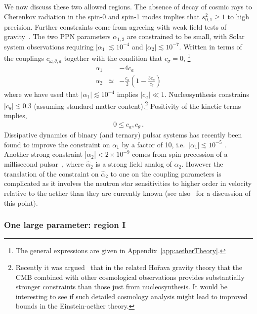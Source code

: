 \documentclass[12pt]{article}
\numberwithin{equation}{section}
\newcommand{\nl}{\nonumber \\}
\begin{document}
We now discuss these two allowed regions. The 
absence of decay of cosmic rays to Cherenkov radiation in the spin-0 and spin-1 modes implies that $s_{0,1}^2 \ge 1$ to high precision.
Further constraints come from agreeing with weak field tests of gravity~\cite{Foster:2005dk}.  The two PPN parameters $\alpha_{1,2}$ are constrained to be  small, with Solar system observations 
requiring $|\alpha_1| \lesssim 10^{-4}$ and $|\alpha_2| \lesssim 10^{-7}$. Written in terms of the couplings $c_{\omega, \theta,a}$ together with the condition that $c_\sigma = 0$, \footnote{The  general expressions are given in Appendix~\ref{app:aetherTheory}. }
\begin{eqnarray}
\label{alphaconstraints}
\alpha_1 & = & - 4 c_a \nl
\alpha_2 & \simeq & - \frac{c_a}{2} \left(  1 -    \frac{3 c_a}{c_\theta}   \right)
\end{eqnarray}
where we have used that $|\alpha_1| \lesssim 10^{-4}$ implies $| c_a | \ll 1 $.
Nucleosynthesis constrains $|c_\theta| \lesssim 0.3$ (assuming standard matter content).\footnote{Recently it was argued~\cite{Frusciante:2020gkx} that in the related Ho\v{r}ava gravity theory that the CMB combined with other cosmological observations provides substantially stronger constraints than those just from nucleosynthesis. It would be interesting to see if such detailed cosmology analysis might lead to improved bounds in the Einstein-aether theory.
}
Positivity of the kinetic terms implies,
\begin{eqnarray}
0 \le c_a, c_\theta \, .
\end{eqnarray}
Dissipative dynamics of binary (and ternary) pulsar systems has recently been found to 
improve the constraint on $\alpha_1$ by a factor of 10, i.e.\,  $|\alpha_1| \lesssim 10^{-5}$ \cite{Gupta:2021vdj}. 
Another strong constraint $|\hat\alpha_2|< 2\times10^{-9}$ comes from spin precession of a millisecond pulsar~\cite{Shao:2013wga,Will:2014kxa},
where $\hat\alpha_2$ is a strong field analog of $\alpha_2$. However the translation of the constraint on $\hat{\alpha}_2$ to one on the coupling parameters is complicated as it involves the neutron star sensitivities to higher order in velocity relative to the aether than they are currently known
(see also~\cite{Oost:2018tcv} for a discussion of this point). 


\subsubsection*{One large parameter: region I}
\end{document}
